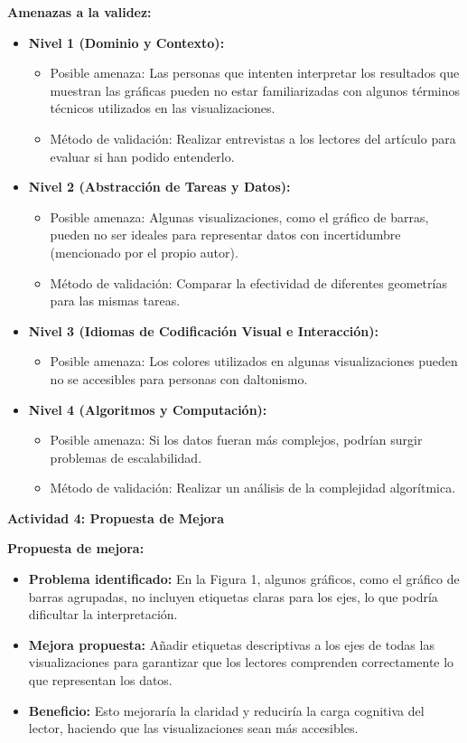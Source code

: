 \textbf{Amenazas a la validez:}
\begin{itemize}[label=\textbullet]
    \item \textbf{Nivel 1 (Dominio y Contexto):}
        \begin{itemize}[label=\textbullet]
            \item Posible amenaza: Las personas que intenten interpretar los resultados que muestran las gráficas pueden no estar familiarizadas con algunos términos técnicos utilizados en las visualizaciones.
            \item Método de validación: Realizar entrevistas a los lectores del artículo para evaluar si han podido entenderlo.
        \end{itemize}
    \item \textbf{Nivel 2 (Abstracción de Tareas y Datos):}
        \begin{itemize}[label=\textbullet]
            \item Posible amenaza: Algunas visualizaciones, como el gráfico de barras, pueden no ser ideales para representar datos con incertidumbre (mencionado por el propio autor).
            \item Método de validación: Comparar la efectividad de diferentes geometrías para las mismas tareas.
        \end{itemize}
    \item \textbf{Nivel 3 (Idiomas de Codificación Visual e Interacción):}
        \begin{itemize}[label=\textbullet]
            \item Posible amenaza: Los colores utilizados en algunas visualizaciones pueden no se accesibles para personas con daltonismo.
        \end{itemize}
    \item \textbf{Nivel 4 (Algoritmos y Computación):} 
        \begin{itemize}[label=\textbullet]
            \item Posible amenaza: Si los datos fueran más complejos, podrían surgir problemas de escalabilidad.
            \item Método de validación: Realizar un análisis de la complejidad algorítmica.
        \end{itemize}
\end{itemize}
\textbf{\Large Actividad 4: Propuesta de Mejora}

\textbf{Propuesta de mejora:}
\begin{itemize}[label=\textbullet]
    \item \textbf{Problema identificado:} En la Figura 1, algunos gráficos, como el gráfico de barras agrupadas, no incluyen etiquetas claras para los ejes, lo que podría dificultar la interpretación.
    \item \textbf{Mejora propuesta:} Añadir etiquetas descriptivas a los ejes de todas las visualizaciones para garantizar que los lectores comprenden correctamente lo que representan los datos.
    \item \textbf{Beneficio:} Esto mejoraría la claridad y reduciría la carga cognitiva del lector, haciendo que las visualizaciones sean más accesibles. 
\end{itemize}

